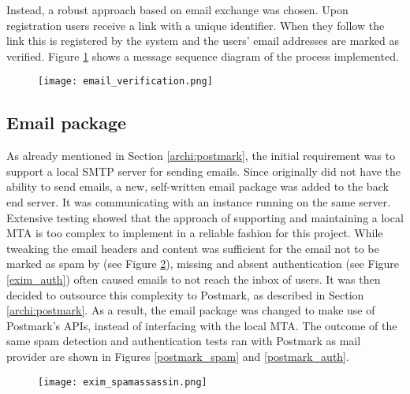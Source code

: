 Instead, a robust approach based on email exchange was chosen. Upon registration users receive a link with a unique identifier. When they follow the link this is registered by the system and the users' email addresses are marked as verified. Figure \ref{veri:dia} shows a message sequence diagram of the process implemented.

\begin{figure}
	\centering
	\texttt{[image: email\_verification.png]}
	\label{veri:dia}
\end{figure}

\subsection{Email package}
\label{impl_email_package}

As already mentioned in Section \ref{archi:postmark}, the initial requirement was to support a local SMTP server for sending emails. Since \lcs originally did not have the ability to send emails, a new, self-written email package was added to the back end server. It was communicating with an  instance running on the same server. Extensive testing showed that the approach of supporting and maintaining a local MTA is too complex to implement in a reliable fashion for this project. While tweaking the email headers and content was sufficient for the email not to be marked as spam by  (see Figure \ref{exim_spam}), missing  and absent  authentication (see Figure \ref{exim_auth}) often caused emails to not reach the inbox of users. It was then decided to outsource this complexity to Postmark, as described in Section \ref{archi:postmark}. As a result, the email package was changed to make use of Postmark's APIs, instead of interfacing with the local MTA. The outcome of the same spam detection and authentication tests ran with Postmark as mail provider are shown in Figures \ref{postmark_spam} and \ref{postmark_auth}.

\begin{figure}
	\centering
	\texttt{[image: exim\_spamassassin.png]}
	\label{exim_spam}
\end{figure}

